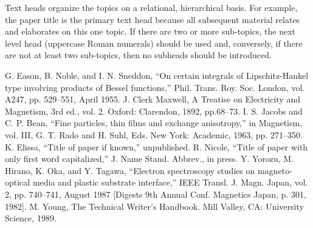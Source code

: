 \documentclass[conference]{IEEEtran}
\begin{document}
Text heads organize the topics on a relational, hierarchical basis. For 
example, the paper title is the primary text head because all subsequent 
material relates and elaborates on this one topic. If there are two or more 
sub-topics, the next level head (uppercase Roman numerals) should be used 
and, conversely, if there are not at least two sub-topics, then no subheads 
should be introduced.

\begin{thebibliography}{00}
 G. Eason, B. Noble, and I. N. Sneddon, ``On certain integrals of Lipschitz-Hankel type involving products of Bessel functions,'' Phil. Trans. Roy. Soc. London, vol. A247, pp. 529--551, April 1955.
 J. Clerk Maxwell, A Treatise on Electricity and Magnetism, 3rd ed., vol. 2. Oxford: Clarendon, 1892, pp.68--73.
 I. S. Jacobs and C. P. Bean, ``Fine particles, thin films and exchange anisotropy,'' in Magnetism, vol. III, G. T. Rado and H. Suhl, Eds. New York: Academic, 1963, pp. 271--350.
 K. Elissa, ``Title of paper if known,'' unpublished.
 R. Nicole, ``Title of paper with only first word capitalized,'' J. Name Stand. Abbrev., in press.
 Y. Yorozu, M. Hirano, K. Oka, and Y. Tagawa, ``Electron spectroscopy studies on magneto-optical media and plastic substrate interface,'' IEEE Transl. J. Magn. Japan, vol. 2, pp. 740--741, August 1987 [Digests 9th Annual Conf. Magnetics Japan, p. 301, 1982].
 M. Young, The Technical Writer's Handbook. Mill Valley, CA: University Science, 1989.
\end{thebibliography}
\end{document}
